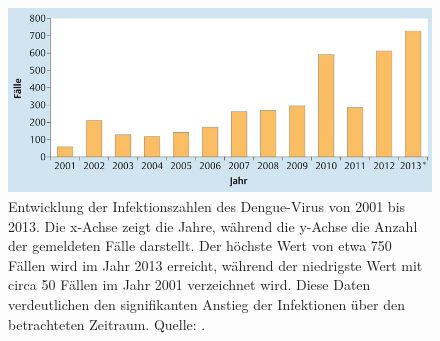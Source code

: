 \documentclass[german,version-2022-01]{uzl-thesis}
\begin{document}
\begin{figure}[tbp]
  \centering
  \includegraphics[scale=0.5]{Images/infektionszahlen_dengue_virus_deutschland.jpeg}
  \caption{Entwicklung der Infektionszahlen des Dengue-Virus von 2001 bis 2013. Die x-Achse zeigt die Jahre, w\"ahrend die y-Achse die Anzahl der gemeldeten F\"alle darstellt. Der h\"ochste Wert von etwa 750 F\"allen wird im Jahr 2013 erreicht, w\"ahrend der niedrigste Wert mit circa 50 F\"allen im Jahr 2001 verzeichnet wird. Diese Daten verdeutlichen den signifikanten Anstieg der Infektionen \"uber den betrachteten Zeitraum. Quelle:  \cite{cramer_dengue-virus_2014}.}
  \label{fig:Dengue_virus_infektionszahlen_deutschland}

\end{figure}
\end{document}
